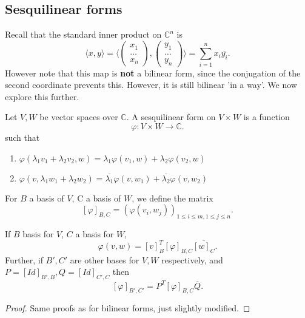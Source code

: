 \documentclass[a4paper]{scrartcl}
\begin{document}
\subsection{Sesquilinear forms}
Recall that the standard inner product on $\mathbb{C}^n$ is 
\[\langle x,y \rangle =\langle \begin{pmatrix}
x_1\\\ldots \\x_n
\end{pmatrix},\begin{pmatrix}
y_1\\\ldots \\y_n
\end{pmatrix} \rangle 
=\sum_{i=1}^{n}x_i \overline{y_i}
.\]
However note that this map is \textbf{not} a bilinear form, since the conjugation of the second coordinate prevents this. However, it is still bilinear 'in a way'. We now explore this further.
\begin{definition}
     Let $V,W$ be vector spaces over $\mathbb{C}$. A sesquilinear form on $V \times W$ is a function 
     \[\varphi: V \times W \to \mathbb{C} .\]
     such that 
     \begin{enumerate}
         \item $\varphi (\lambda_1 v_1+ \lambda_2 v_2, w)=\lambda_1 \varphi (v_1,w) + \lambda_2 \varphi (v_2,w)$
         \item $\varphi (v,\lambda_1 w_1+ \lambda_2 w_2)=\overline{\lambda_1} \varphi (v,w_1) + \overline{\lambda_2} \varphi (v,w_2)$
     \end{enumerate}
     For $B$ a basis of $V$, C a basis of $W$, we define the matrix 
     \[[\varphi]_{B,C}=(\varphi (v_i,w_j))_{1 \leq i \leq m, 1 \leq j \leq n}.\]
\end{definition}
\begin{lemma}
     If $B$ basis for $V$, $C$ a basis for $W$,
     \[\varphi (v,w)=[v]_B^T [\varphi]_{B,C}\overline{[w]_C}.\]
     Further, if $B',C'$ are other bases for $V,W$ respectively, and $P=[Id]_{B',B}, Q=[Id]_{C',C}$ then 
     \[[\varphi]_{B',C'}=P^T [\varphi]_{B,C} \overline{Q}.\]
     
\end{lemma}
\begin{proof}
     Same proofs as for bilinear forms, just slightly modified.
\end{proof}
\end{document}
